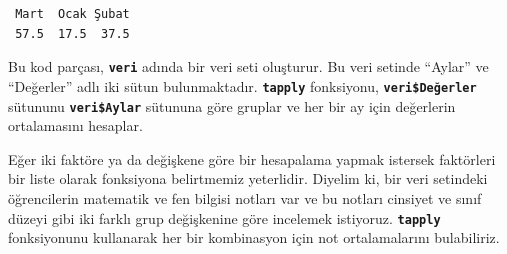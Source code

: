 \documentclass[
  letterpaper,
  DIV=11,
  numbers=noendperiod]{scrreprt}
\newenvironment{Shaded}{\begin{snugshade}}{\end{snugshade}}
\newcommand{\AttributeTok}[1]{\textcolor[rgb]{0.40,0.45,0.13}{#1}}
\newcommand{\CommentTok}[1]{\textcolor[rgb]{0.37,0.37,0.37}{#1}}
\newcommand{\DecValTok}[1]{\textcolor[rgb]{0.68,0.00,0.00}{#1}}
\newcommand{\FunctionTok}[1]{\textcolor[rgb]{0.28,0.35,0.67}{#1}}
\newcommand{\NormalTok}[1]{\textcolor[rgb]{0.00,0.23,0.31}{#1}}
\newcommand{\OtherTok}[1]{\textcolor[rgb]{0.00,0.23,0.31}{#1}}
\newcommand{\SpecialCharTok}[1]{\textcolor[rgb]{0.37,0.37,0.37}{#1}}
\newcommand{\StringTok}[1]{\textcolor[rgb]{0.13,0.47,0.30}{#1}}
\begin{document}
\begin{Shaded}
\end{Shaded}

\begin{verbatim}
 Mart  Ocak Şubat 
 57.5  17.5  37.5 
\end{verbatim}

Bu kod parçası, \textbf{\texttt{veri}} adında bir veri seti oluşturur.
Bu veri setinde ``Aylar'' ve ``Değerler'' adlı iki sütun bulunmaktadır.
\textbf{\texttt{tapply}} fonksiyonu, \textbf{\texttt{veri\$Değerler}}
sütununu \textbf{\texttt{veri\$Aylar}} sütununa göre gruplar ve her bir
ay için değerlerin ortalamasını hesaplar.

Eğer iki faktöre ya da değişkene göre bir hesapalama yapmak istersek
faktörleri bir liste olarak fonksiyona belirtmemiz yeterlidir. Diyelim
ki, bir veri setindeki öğrencilerin matematik ve fen bilgisi notları var
ve bu notları cinsiyet ve sınıf düzeyi gibi iki farklı grup değişkenine
göre incelemek istiyoruz. \textbf{\texttt{tapply}} fonksiyonunu
kullanarak her bir kombinasyon için not ortalamalarını bulabiliriz.
\end{document}
